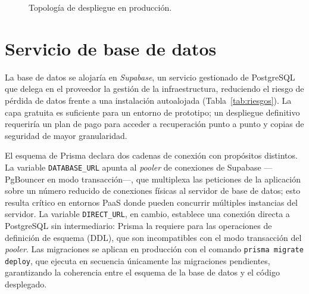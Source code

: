\documentclass[11pt,oneside,spanish,listoffigures,listoftables]{tfgetsinf}
\begin{document}
\begin{figure}[htbp]
\centering
{}
\caption[Topología de despliegue en producción]{Topología de despliegue en producción.}
\label{fig:arquitectura-produccion}
\end{figure}

\section{Servicio de base de datos}

La base de datos se alojaría en \textit{Supabase}, un servicio gestionado de PostgreSQL que delega en el proveedor la gestión de la infraestructura, reduciendo el riesgo de pérdida de datos frente a una instalación autoalojada (Tabla~\ref{tab:riesgos}). La capa gratuita es suficiente para un entorno de prototipo; un despliegue definitivo requeriría un plan de pago para acceder a recuperación punto a punto y copias de seguridad de mayor granularidad.

El esquema de Prisma declara dos cadenas de conexión con propósitos distintos. La variable \texttt{DATABASE\_URL} apunta al \textit{pooler} de conexiones de Supabase —PgBouncer en modo transacción—, que multiplexa las peticiones de la aplicación sobre un número reducido de conexiones físicas al servidor de base de datos; esto resulta crítico en entornos PaaS donde pueden concurrir múltiples instancias del servidor. La variable \texttt{DIRECT\_URL}, en cambio, establece una conexión directa a PostgreSQL sin intermediario: Prisma la requiere para las operaciones de definición de esquema (DDL), que son incompatibles con el modo transacción del \textit{pooler}. Las migraciones se aplican en producción con el comando \texttt{prisma migrate deploy}, que ejecuta en secuencia únicamente las migraciones pendientes, garantizando la coherencia entre el esquema de la base de datos y el código desplegado.
\end{document}
